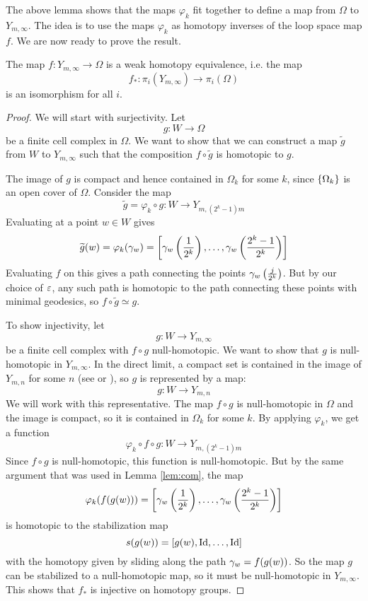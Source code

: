 The above lemma shows that the maps $\varphi_k$ fit together to define
a map from $\Omega$ to $Y_{m,\infty}$.
The idea is to use the maps $\varphi_k$ as homotopy inverses of the
loop space map $f$. We are now ready to prove the result.

\begin{theorem}
  The map $f : Y_{m,\infty} \to \Omega$ is a weak homotopy
  equivalence, i.e. the map
  \[f_* : \pi_i(Y_{m,\infty}) \to \pi_i(\Omega)\]
  is an isomorphism for all $i$.
\end{theorem}

\begin{proof}
  We will start with surjectivity. Let
  \[ g : W \to \Omega \]
  be a finite cell complex in $\Omega$. We want to show that we can
  construct a map $\widetilde g$ from $W$ to $Y_{m,\infty}$ such that
  the composition $f\circ \widetilde g$ is homotopic to $g$.
  
  The image of $g$ is compact and hence contained in $\Omega_k$ for
  some $k$, since $\left\{ \Omega_k \right\}$ is an open cover of
  $\Omega$. Consider the map 
  \[ \widetilde g = \varphi_k\circ g : W \to Y_{m,(2^k-1)m} \]
  Evaluating at a point $w\in W$ gives
  \[ \widetilde g(w) = \varphi_k(\gamma_w) = \left[
    \gamma_w\left(\frac{1}{2^k}\right),\dots,
    \gamma_w\left(\frac{2^k-1}{2^k}\right) \right] \]
  Evaluating $f$ on this gives a path connecting the points
  $\gamma_w\left(\frac{j}{2^k}\right)$. But by our choice of $\varepsilon$, any
  such path is homotopic to the path connecting these points with
  minimal geodesics, so $f\circ\widetilde g \simeq g$.

  To show injectivity, let
  \[ g : W \to Y_{m,\infty}\]
  be a finite cell complex with $f\circ g$ null-homotopic. We want to
  show that $g$ is null-homotopic in $Y_{m,\infty}$. In the
  direct limit, a compact set is contained in the image of $Y_{m,n}$
  for some $n$ (see \cite[Proposition~A.1]{hatcher} or
  \cite[Chapter~9.4]{may}), so $g$ is represented by a map:
  \[ g : W \to Y_{m,n} \]
  We will work with this representative. The map $f\circ
  g$ is null-homotopic in $\Omega$ and the image is compact, so it is
  contained in $\Omega_k$ for some $k$. By applying $\varphi_k$, we
  get a function
  \[ \varphi_k\circ f\circ g : W \to Y_{m,(2^k-1)m} \]
  Since $f\circ g$ is null-homotopic, this function is
  null-homotopic. But by the same argument that was used in
  Lemma \ref{lem:com}, the map
  \[ \varphi_k(f(g(w))) = \left[
    \gamma_w\left(\frac{1}{2^k}\right),\dots,\gamma_w\left(\frac{2^k-1}{2^k}
    \right)\right] \] 
  is homotopic to the stabilization map
  \[ s(g(w)) = \left[g(w),\operatorname{Id},\dots,\operatorname{Id}\right] \]
  with the homotopy given by sliding along the path $\gamma_w=f(g(w))$.
  So the map $g$ can be stabilized to a null-homotopic map, so it must
  be null-homotopic in $Y_{m,\infty}$. This shows that $f_*$ is
  injective on homotopy groups.
\end{proof}

